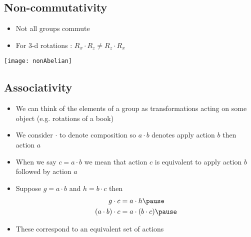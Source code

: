 
\begin{slide}
\section[-2]{Non-commutativity}
  
\begin{PauseHighLight}
  \begin{itemize}
  \item Not all groups commute\pause
  \item For 3-d rotations : $R_x \cdot  R_z  \neq R_z\cdot R_x$\pause
  \end{itemize}
\end{PauseHighLight}
\begin{center}
  \texttt{[image: nonAbelian]}\pauseb
\end{center}
\end{slide}


\begin{slide}
\section[-2]{Associativity}

\begin{PauseHighLight}
  \begin{itemize}
  \item We can think of the elements of a group as transformations
    acting on some object (e.g. rotations of a book)\pause
  \item We consider $\cdot$ to denote composition so $a \cdot b$
    denotes apply action $b$ then action $a$\pause
  \item When we say $c=a \cdot b$ we mean that action $c$ is
    equivalent to apply action $b$ followed by action $a$\pause
  \item Suppose $g = a \cdot b$ and $h = b \cdot c$ then
    \begin{align*}
      g \cdot c &= a \cdot h\pause \\
      (a \cdot b) \cdot c &= a \cdot (b \cdot c)\pause
    \end{align*}
  \item These correspond to an equivalent set of actions\pause
  \end{itemize}
\end{PauseHighLight}


\end{slide}


